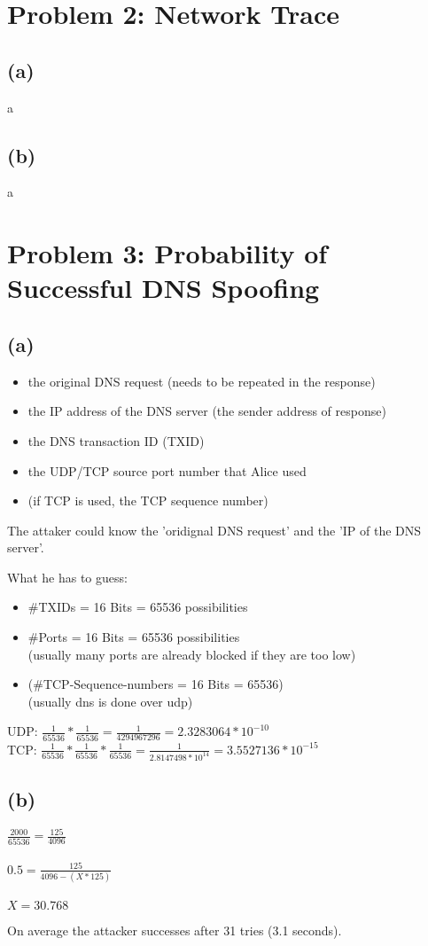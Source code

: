\documentclass[12pt,pdftex,a4paper]{article}
\begin{document}
\newpage
\section*{Problem 2: Network Trace}
\subsection*{(a)}
a

\subsection*{(b)}
a

\section*{Problem 3: Probability of Successful DNS Spoofing}
\subsection*{(a)}
\begin{itemize}
	\item the original DNS request (needs to be repeated in the response)
	\item the IP address of the DNS server (the sender address of response)
	\item the DNS transaction ID (TXID)
	\item the UDP/TCP source port number that Alice used
	\item (if TCP is used, the TCP sequence number)
\end{itemize}

The attaker could know the 'oridignal DNS request' and the 'IP of the DNS server'.

What he has to guess:

\begin{itemize}
	\item \#TXIDs = 16 Bits = 65536 possibilities
	\item \#Ports = 16 Bits = 65536 possibilities\\(usually many ports are already blocked if they are too low)
	\item (\#TCP-Sequence-numbers = 16 Bits = 65536)\\(usually dns is done over udp)
\end{itemize}

UDP: $ \frac{1}{65536} * \frac{1}{65536} = \frac{1}{4294967296} = 2.3283064*10^{-10} $
\\

TCP: $ \frac{1}{65536} * \frac{1}{65536} * \frac{1}{65536} = \frac{1}{2.8147498*10^{14}} = 3.5527136*10^{-15} $

\subsection*{(b)}
$ \frac{2000}{65536} = \frac{125}{4096} $
\\~\\
$ 0.5 = \frac{125}{4096-(X*125)}$
\\~\\
$ X = 30.768 $

On average the attacker successes after 31 tries (3.1 seconds).
\end{document}
